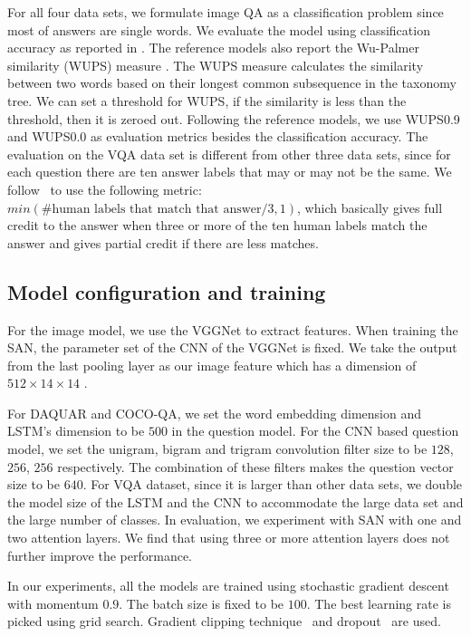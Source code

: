 \documentclass[10pt,twocolumn,letterpaper]{article}
\begin{document}
For all four data sets, we formulate image QA as a classification problem since
most of answers are single words. We evaluate the model using classification
accuracy as reported in \cite{antol2015vqa, ren2015imageqa,
  malinowski2015ask}. The reference models also report the Wu-Palmer similarity
(WUPS) measure \cite{wu1994verbs}. The WUPS measure calculates the similarity
between two words based on their longest common subsequence in the taxonomy
tree. We can set a \mbox{threshold} for WUPS, if the similarity is less than
the threshold, then it is zeroed out. Following the reference models, we use
WUPS0.9 and WUPS0.0 as evaluation metrics besides the classification
accuracy. The evaluation on the VQA data set is different from other three data
sets, since for each question there are ten answer labels that may or may not
be the same. We follow~\cite{antol2015vqa} to use the following metric:
$min( \text{\# human labels that match that answer}/ 3 , 1)$, which basically
gives full credit to the answer when three or more of the ten human labels
match the answer and gives partial credit if there are less matches.

\subsection{Model configuration and training}
For the image model, we use the VGGNet to extract features. When training the
SAN, the parameter set of the CNN of the VGGNet is fixed. We take the output
from the last pooling layer as our image feature which has a dimension of
$512\times 14 \times 14$ .

For DAQUAR and COCO-QA, we set the word embedding dimension and LSTM's
dimension to be $500$ in the question model. For the CNN based question model,
we set the unigram, bigram and trigram convolution filter size to be $128$,
$256$, $256$ respectively. The combination of these filters makes the question
vector size to be $640$. For VQA dataset, since it is larger than other data
sets, we double the model size of the LSTM and the CNN to accommodate the large
data set and the large number of classes. In evaluation, we experiment with SAN
with one and two attention layers. We find that using three or more attention
layers does not further improve the performance.

In our experiments, all the models are trained using stochastic gradient
descent with momentum $0.9$. The batch size is fixed to be $100$. The best
learning rate is picked using grid search. Gradient clipping
technique~\cite{graves2013generating} and dropout~\cite{srivastava2014dropout}
are used.
\end{document}
